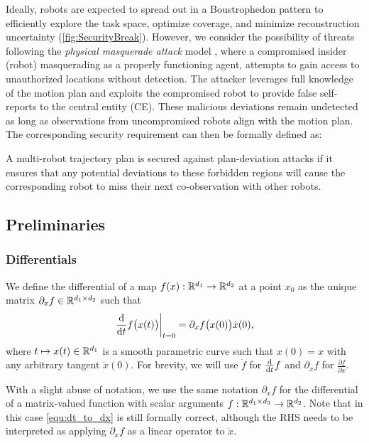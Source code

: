\documentclass[10pt,twocolumn,twoside]{IEEEtran}
\begin{document}
 Ideally, robots are expected to spread out in a Boustrophedon pattern to efficiently explore the task space, optimize coverage, and minimize reconstruction uncertainty (\cref{fig:SecurityBreak}). However, we consider the possibility of threats following the \emph{physical masquerade attack} model \cite{wardega2019resilience}, where a compromised insider (robot) masquerading as a properly functioning agent, attempts to gain access to unauthorized locations without detection. The attacker leverages full knowledge of the motion plan and exploits the compromised robot to provide false self-reports to the central entity (CE). These malicious deviations remain undetected as long as observations from uncompromised robots align with the motion plan. The corresponding security requirement can then be formally defined as:
\begin{definition}\label{def:secured-plan}
  A multi-robot trajectory plan is secured against plan-deviation attacks if it ensures that any potential deviations to these forbidden regions will cause the corresponding robot to miss their next co-observation with other robots. 
\end{definition}

\subsection{Preliminaries}
\subsubsection{Differentials}
We define the differential of a map $f(x):\mathbb{R}^{d_1}{}\to\mathbb{R}^{d_2}{}$ at a point $x_0$ as the unique matrix $\partial_x f \in\mathbb{R}^{d_1\times d_2}{}$ such that
\begin{equation}\label{equ:dt_to_dx}
  \left.\frac{\mathrm{d} }{\mathrm{d} t} f\bigl(x(t)\bigr)\right|_{t=0}=\partial_x f\bigl(x(0)\bigr) \dot{x}(0),
\end{equation}
where $t\mapsto x(t)\in\mathbb{R}^{d_1}{}$ is a smooth parametric curve such that $x(0)=x$ with any arbitrary tangent $\dot{x}(0)$. For brevity, we will use $\dot f$ for $\frac{\mathrm{d} }{\mathrm{d} t} f$ and $\partial_x f$ for $\frac{\partial f}{\partial x}$. 

With a slight abuse of notation, we use the same notation $\partial_xf$ for the differential of a matrix-valued function with scalar arguments $f:\mathbb{R}^{d_1 \times d_3}{}\to\mathbb{R}^{d_2}{}$.  Note that in this case \eqref{equ:dt_to_dx} is still formally correct, although the RHS needs to be interpreted as applying $\partial_x f$ as a linear operator to $\dot{x}$.
\end{document}

